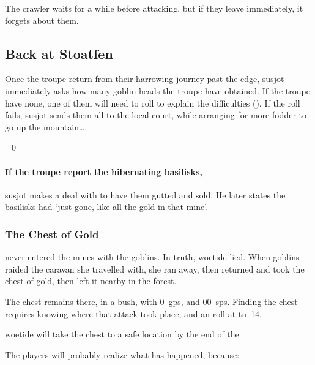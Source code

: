 \begin{multicols}{2}
  The \gls{crawler} waits for a while before attacking, but if they leave immediately, it forgets about them.

  \chitincrawler
\fi

\subsection{Back at Stoatfen }

Once the troupe return from their harrowing journey past the \gls{edge}, \gls{susjot} immediately asks how many goblin heads the troupe have obtained.
If the troupe have none, one of them will need to roll  to explain the difficulties (\tn[8]).
If the roll fails, \gls{susjot} sends them all to the local \gls{court}, while arranging for more \gls{fodder} to go up the mountain\ldots

\ifnum\value{temperature}=0
  \paragraph{If the troupe report the hibernating \glspl{basilisk},}
  \gls{susjot} makes a deal with  to have them gutted and sold.
  He later states the \glspl{basilisk} had `just gone, like all the gold in that mine'.
\fi

\subsubsection{The Chest of Gold}
\label{goldConspiracy}
never entered the mines with the goblins.
In truth, \gls{woetide} lied.
When goblins raided the caravan she travelled with, she ran away, then returned and took the chest of gold, then left it nearby in the forest.

The chest remains there, in a bush, with 0~\glspl{gp}, and 
\randomize{}00~\glspl{sp}.
Finding the chest requires knowing where that attack took place, and an  roll at \gls{tn}~14.

\Gls{woetide} will take the chest to a safe location by the end of the .

The players will probably realize what has happened, because:



\end{multicols}
